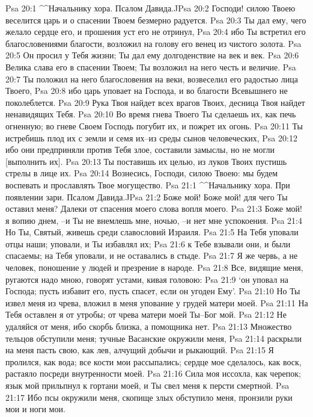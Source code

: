 Psa 20:1  ^^Начальнику хора. Псалом Давида.^^
Psa 20:2  Господи! силою Твоею веселится царь и о спасении Твоем безмерно радуется.
Psa 20:3  Ты дал ему, чего желало сердце его, и прошения уст его не отринул,
Psa 20:4  ибо Ты встретил его благословениями благости, возложил на голову его венец из чистого золота.
Psa 20:5  Он просил у Тебя жизни; Ты дал ему долгоденствие на век и век.
Psa 20:6  Велика слава его в спасении Твоем; Ты возложил на него честь и величие.
Psa 20:7  Ты положил на него благословения на веки, возвеселил его радостью лица Твоего,
Psa 20:8  ибо царь уповает на Господа, и во благости Всевышнего не поколеблется.
Psa 20:9  Рука Твоя найдет всех врагов Твоих, десница Твоя найдет ненавидящих Тебя.
Psa 20:10  Во время гнева Твоего Ты сделаешь их, как печь огненную; во гневе Своем Господь погубит их, и пожрет их огонь.
Psa 20:11  Ты истребишь плод их с земли и семя их--из среды сынов человеческих,
Psa 20:12  ибо они предприняли против Тебя злое, составили замыслы, но не могли [выполнить их].
Psa 20:13  Ты поставишь их целью, из луков Твоих пустишь стрелы в лице их.
Psa 20:14  Вознесись, Господи, силою Твоею: мы будем воспевать и прославлять Твое могущество.
Psa 21:1  ^^Начальнику хора. При появлении зари. Псалом Давида.^^
Psa 21:2  Боже мой! Боже мой! для чего Ты оставил меня? Далеки от спасения моего слова вопля моего.
Psa 21:3  Боже мой! я вопию днем, --и Ты не внемлешь мне, ночью, --и нет мне успокоения.
Psa 21:4  Но Ты, Святый, живешь среди славословий Израиля.
Psa 21:5  На Тебя уповали отцы наши; уповали, и Ты избавлял их;
Psa 21:6  к Тебе взывали они, и были спасаемы; на Тебя уповали, и не оставались в стыде.
Psa 21:7  Я же червь, а не человек, поношение у людей и презрение в народе.
Psa 21:8  Все, видящие меня, ругаются надо мною, говорят устами, кивая головою:
Psa 21:9  `он уповал на Господа; пусть избавит его, пусть спасет, если он угоден Ему'.
Psa 21:10  Но Ты извел меня из чрева, вложил в меня упование у грудей матери моей.
Psa 21:11  На Тебя оставлен я от утробы; от чрева матери моей Ты--Бог мой.
Psa 21:12  Не удаляйся от меня, ибо скорбь близка, а помощника нет.
Psa 21:13  Множество тельцов обступили меня; тучные Васанские окружили меня,
Psa 21:14  раскрыли на меня пасть свою, как лев, алчущий добычи и рыкающий.
Psa 21:15  Я пролился, как вода; все кости мои рассыпались; сердце мое сделалось, как воск, растаяло посреди внутренности моей.
Psa 21:16  Сила моя иссохла, как черепок; язык мой прильпнул к гортани моей, и Ты свел меня к персти смертной.
Psa 21:17  Ибо псы окружили меня, скопище злых обступило меня, пронзили руки мои и ноги мои.
